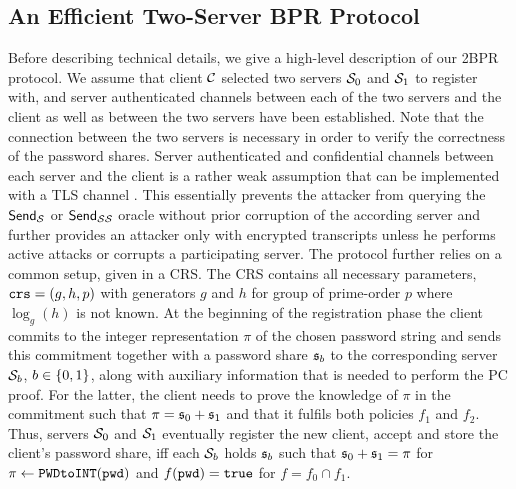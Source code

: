 
\subsection{An Efficient Two-Server BPR Protocol}\label{sec:framework}
Before describing technical details, we give a high-level description of our \ac{2BPR} protocol.
We assume that client $\mathcal{C}$ selected two servers $\mathcal{S}_0$ and $\mathcal{S}_1$ to register with, and server authenticated channels between each of the two servers and the client as well as between the two servers have been established.
Note that the connection between the two servers is necessary in order to verify the correctness of the password shares.
Server authenticated and confidential channels between each server and the client is a rather weak assumption that can be implemented with a \ac{TLS} channel \cite{rfc5246,JagerKSS12,KrawczykPW13}.
This essentially prevents the attacker from querying the $\mathsf{Send}_\mathcal{S}$ or $\mathsf{Send}_{\mathcal{S}\mathcal{S}}$ oracle without prior corruption of the according server and further provides an attacker only with encrypted transcripts unless he performs active attacks or corrupts a participating server.
The protocol further relies on a common setup, given in a \ac{CRS}.
The \ac{CRS} contains all necessary parameters, \ie $\mathtt{crs}=(g, h, p)$ with generators $g$ and $h$ for group of prime-order $p$ where $\log_g(h)$ is not known.
At the beginning of the registration phase the client commits to the integer representation $\pi$ of the chosen password string \pwd and sends this commitment together with a password share $\mathfrak{s}_b$ to the corresponding server $\mathcal{S}_b$, $b\in\{0,1\}$, along with auxiliary information that is needed to perform the \ac{PC} proof.
For the latter, the client needs to prove the knowledge of $\pi$ in the commitment such that $\pi = \mathfrak{s}_0 + \mathfrak{s}_1$ and that it fulfils both policies $f_1$ and $f_2$.
Thus, servers $\mathcal{S}_0$ and $\mathcal{S}_1$ eventually register the new client, accept and store the client's password share, iff each $\mathcal{S}_b$ holds $\mathfrak{s}_b$ such that $\mathfrak{s}_0+\mathfrak{s}_1=\pi$ for $\pi\gets\texttt{PWDtoINT}(\mathtt{pwd})$ and $f(\mathtt{pwd})=\mathtt{true}$ for $f=f_0\cap f_1$.

